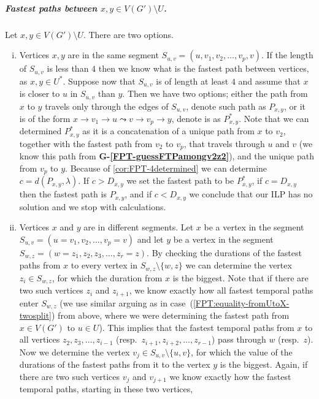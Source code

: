 \documentclass[a4paper,UKenglish,cleveref, autoref, thm-restate]{lipics-v2021}
\begin{document}
\subparagraph{\boldmath Fastest paths between $x,y\in V(G') \setminus U$.}
Let $x,y \in V(G') \setminus U$.
There are two options.
\begin{enumerate}[(i)]
    \item Vertices $x,y$ are in the same segment $S_{u,v} = (u,v_1,v_2, \dots, v_p, v)$. 
    If the length of $S_{u,v}$ is less than $4$ then we know what is the fastest path between vertices, as $x,y \in U^*$.
    Suppose now that $S_{u,v}$ is of length at least $4$ and assume that $x$ is closer to $u$ in $S_{u,v}$ than $y$.
    Then we have two options; either the path from $x$ to $y$ travels only through the edges of $S_{u,v}$, denote such path as $P_{x,y}$,
    or it is of the form $x \rightarrow v_1 \rightarrow u \leadsto v \rightarrow v_p \rightarrow y$, denote is as $P_{x,y}^*$.
    Note that we can determined $P_{x,y}^*$ as it is a concatenation of a unique path from $x$ to $v_2$, together with the fastest path from $v_2$ to $v_{p}$, that travels through $u$ and $v$ (we know this path from \textcolor{lipicsGray}{\textsf{\textbf{G-\ref{FPT-guessFTPamongv2z2}}}}),
    and the unique path from $v_p$ to $y$.
    Because of \cref{cor:FPT-4determined} we can determine $c = d(P_{x,y}, \lambda)$.
    If $c > D_{x,y}$ we set the fastest path to be $P_{x,y}^*$,
    if $c = D_{x,y}$ then the fastest path is $P_{x,y}$, and if 
    $c < D_{x,y}$ we conclude that our ILP has no solution and we stop with calculations.
    \item Vertices $x$ and $y$ are in different segments. 
Let $x$ be a vertex in the segment $S_{u,v} = (u=v_1,v_2, \dots, v_p = v)$ and let $y$ be a vertex in the segment $S_{w,z} = (w=z_1, z_2,z_3, \dots, z_r = z)$.
%
By checking the durations of the fastest paths from $x$ to every vertex in $S_{w,z} \setminus \{w,z\}$
we can determine the vertex $z_i \in S_{w,z} $, for which the duration from $x$ is the biggest.
Note that if there are two such vertices $z_i$ and $z_{i+1}$, we know exactly how all fastest temporal paths enter $S_{w,z}$ 
(we use similar arguing as in case~(\ref{FPT:equality-fromUtoX-twosplit}) from above, where we were determining the fastest path from $x \in V(G')$ to $u \in U$).
This implies that the fastest temporal paths from $x$ to all vertices $z_2, z_3, \dots, z_{i-1}$ (resp.~$z_{i+1}, z_{i+2}, \dots, z_{r-1}$)  pass through $w$ (resp.~$z$).
Now we determine the vertex $v_j \in S_{u,v} \setminus \{u,v\}$,
for which the value of the durations of the fastest paths from it to the vertex $y$ is the biggest.
Again, if there are two such vertices $v_{j}$ and $v_{j+1}$ we know exactly how the fastest temporal paths, starting in these two vertices,

\end{enumerate}
\end{document}
